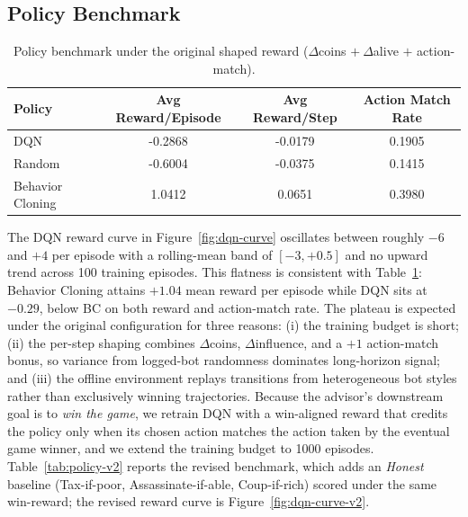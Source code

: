 \documentclass[11pt]{article}
\begin{document}
\subsection{Policy Benchmark}
\label{sec:policy-benchmark}
\begin{table}[H]
\centering
\caption{Policy benchmark under the original shaped reward ($\Delta$coins $+\ \Delta$alive $+$ action-match).}
\label{tab:policy}
\begin{tabular}{lccc}
\toprule
Policy & Avg Reward/Episode & Avg Reward/Step & Action Match Rate \\
\midrule
DQN & -0.2868 & -0.0179 & 0.1905 \\
Random & -0.6004 & -0.0375 & 0.1415 \\
Behavior Cloning & 1.0412 & 0.0651 & 0.3980 \\
\bottomrule
\end{tabular}
\end{table}

The DQN reward curve in Figure~\ref{fig:dqn-curve} oscillates between roughly $-6$ and $+4$ per episode with a rolling-mean band of $[-3, +0.5]$ and no upward trend across 100 training episodes. This flatness is consistent with Table~\ref{tab:policy}: Behavior Cloning attains $+1.04$ mean reward per episode while DQN sits at $-0.29$, below BC on both reward and action-match rate. The plateau is expected under the original configuration for three reasons: (i) the training budget is short; (ii) the per-step shaping combines $\Delta$coins, $\Delta$influence, and a $+1$ action-match bonus, so variance from logged-bot randomness dominates long-horizon signal; and (iii) the offline environment replays transitions from heterogeneous bot styles rather than exclusively winning trajectories. Because the advisor's downstream goal is to \emph{win the game}, we retrain DQN with a win-aligned reward that credits the policy only when its chosen action matches the action taken by the eventual game winner, and we extend the training budget to 1000 episodes. Table~\ref{tab:policy-v2} reports the revised benchmark, which adds an \textit{Honest} baseline (Tax-if-poor, Assassinate-if-able, Coup-if-rich) scored under the same win-reward; the revised reward curve is Figure~\ref{fig:dqn-curve-v2}.
\end{document}
